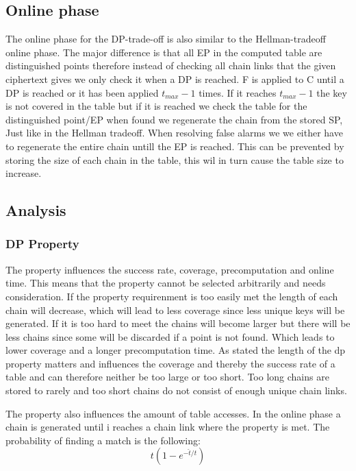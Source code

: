 \subsection{Online phase}
The online phase for the DP-trade-off is also similar to the Hellman-tradeoff online phase. The major difference is that all EP in the computed table are distinguished points therefore instead of checking all chain links that the given ciphertext gives we only check it when a DP is reached. F is applied to C until a DP is reached or it has been applied $t_{max}-1$ times. If it reaches $t_{max}-1$ the key is not covered in the table but if it is reached we check the table for the distinguished point/EP when found we regenerate the chain from the stored SP, Just like in the Hellman tradeoff. When resolving false alarms we we either have to regenerate the entire chain untill the EP is reached. This can be prevented by storing the size of each chain in the table, this wil in turn cause the table size to increase.

\subsection{Analysis}
\subsubsection{DP Property}
The property influences the success rate, coverage, precomputation and online time. This means that the property cannot be selected arbitrarily and needs consideration. If the property requirenment is too easily met the length of each chain will decrease, which will lead to less coverage since less unique keys will be generated. If it is too hard to meet the chains will become larger but there will be less chains since some will be discarded if a point is not found. Which leads to lower coverage and a longer precomputation time. As stated the length of the dp property matters and influences the coverage and thereby the success rate of a table and can therefore neither be too large or too short. Too long chains are stored to rarely and too short chains do not consist of enough unique chain links.

The property also influences the amount of table accesses. In the online phase a chain is generated until i reaches a chain link where the property is met. The probability of finding a match is the following:
\begin{equation}
t(1-e^{-\hat{t}/t})
\end{equation}

